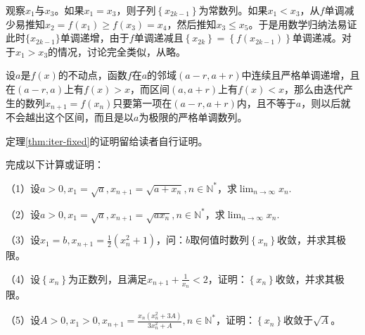 观察\(x_{1}\)与\(x_{3}\)。如果\(x_{1} = x_{3}\)，则子列\(\left\{ x_{2 k - 1} \right\}\)为常数列。如果\(x_{1} < x_{3}\)，从\(f\)单调减少易推知\(x_{2} = f \left( x_{1} \right) \ge f \left( x_{3} \right) = x_{4}\)，然后推知\(x_{3} \le x_{5}\)。于是用数学归纳法易证此时\(\{ x_{2 k - 1} \}\)单调递增，由于\(f\)单调递减且\(\left\{ x_{2 k} \right\} = \left\{ f \left( x_{2 k - 1} \right) \right\}\)单调递减。对于\(x_{1} > x_{3}\)的情况，讨论完全类似，从略。

\begin{theorem}\label{thm:iter-fixed}
设\(a\)是\(f \left( x \right)\)的不动点，函数\(f\)在\(a\)的邻域\(\left( a - r , a + r \right)\)中连续且严格单调递增，且在\(\left( a - r , a \right)\)上有\(f \left( x \right) > x\)，而区间\(\left( a , a + r \right)\)上有\(f \left( x \right) < x\)，那么由迭代产生的数列\(x_{n + 1} = f \left( x_{n} \right)\)只要第一项在\(\left( a - r , a + r \right)\)内，且不等于\(a\)，则以后就不会越出这个区间，而且是以\(a\)为极限的严格单调数列。
\end{theorem}

定理\ref{thm:iter-fixed}的证明留给读者自行证明。

\begin{example}
    完成以下计算或证明：
    
    （1）设\(a > 0 , x_{1} = \sqrt{a} , x_{n + 1} = \sqrt{a + x_{n}} , n \in \mathbb{N}^{*}\)，求\(\lim_{n \to \infty} x_{n}\).

    （2）设\(a > 0 , x_{1} = \sqrt{a} , x_{n + 1} = \sqrt{a x_{n}} , n \in \mathbb{N}^{*}\)，求\(\lim_{n \to \infty} x_{n}\).

    （3）设\(x_{1} = b , x_{n + 1} = \frac{1}{2} \left( x_{n}^{2} + 1 \right)\)，问：\(b\)取何值时数列\(\left\{ x_{n} \right\}\)收敛，并求其极限。

    （4）设\(\left\{ x_{n} \right\}\)为正数列，且满足\(x_{n + 1} + \frac{1}{x_{n}} < 2\)，证明：\(\left\{ x_{n} \right\}\)收敛，并求其极限。

    （5）设\(A > 0 , x_{1} > 0 , x_{n + 1} = \frac{x_{n} \left( x_{n}^{2} + 3 A \right)}{3 x_{n}^{2} + A} , n \in \mathbb{N}^{*}\)，证明：\(\left\{ x_{n} \right\}\)收敛于\(\sqrt{A}\)。
\end{example}
